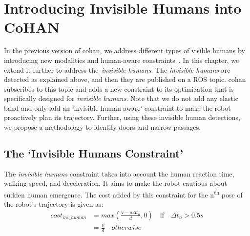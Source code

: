 \section{Introducing Invisible Humans into CoHAN}\label{cohan_inv_human}
In the previous version of \acrshort{cohan}, we address different types of visible humans by introducing new modalities and human-aware constraints~\cite{singamaneni2021human}. In this chapter, we extend it further to address the~\textit{invisible humans}. The \textit{invisible humans} are detected as explained above, and then they are published on a ROS topic. \acrshort{cohan} subscribes to this topic and adds a new constraint to its optimization that is specifically designed for \textit{invisible humans}. Note that we do not add any elastic band and only add an `invisible human-aware' constraint to make the robot proactively plan its trajectory. Further, using these invisible human detections, we propose a methodology to identify doors and narrow passages.

\subsection{The `Invisible Humans Constraint’}
The \textit{invisible humans} constraint takes into account the human reaction time, walking speed, and deceleration. It aims to make the robot cautious about sudden human emergence. The cost added by this constraint for the n\textsuperscript{th} pose of the robot's trajectory is given as:
\begin{equation}
\begin{split}
cost_{inv\_human} &= max\left(\frac{V-a\Delta t_n}{d}, 0\right)\quad \text{if}\quad \Delta t_n> 0.5s\\
                &= \frac{V}{d}\quad otherwise
\end{split}
\label{cost_}
\end{equation}

